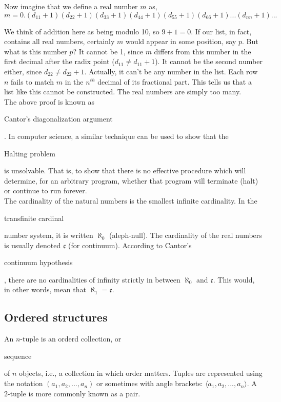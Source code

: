 \documentclass[11pt]{article}
\theoremstyle{plain}
\theoremstyle{definition}
\begin{document}
\noindent Now imagine that we define a real number $ m $ as,
$$
m = 0.(d_{11}+1)(d_{22}+1)(d_{33}+1)(d_{44}+1)(d_{55}+1)(d_{66}+1) ... (d_{nn}+1) ...
$$

\noindent We think of addition here as being modulo 10, so $ 9 + 1 = 0 $. If our list, in fact, contains all real numbers, certainly $ m $ would appear in some position, say $ p $. But what is this number $ p $? It cannot be 1, since $ m $ differs from this number in the first decimal after the radix point ($ d_{11} \ne d_{11} + 1 $). It cannot be the second number either, since $ d_{22} \ne d_{22} + 1 $. Actually, it can't be any number in the list. Each row $ n $ fails to match $ m $ in the $ n^{th} $ decimal of its fractional part. This tells us that a list like this cannot be constructed. The real numbers are simply too many. \\

\noindent The above proof is known as \begin{em}Cantor's diagonalization argument\end{em}. In computer science, a similar technique can be used to show that the \begin{em}Halting problem\end{em} is unsolvable. That is, to show that there is no effective procedure which will determine, for an arbitrary program, whether that program will terminate (halt) or continue to run forever. \\

\noindent The cardinality of the natural numbers is the smallest infinite cardinality. In the \begin{em}transfinite cardinal\end{em} number system, it is written $ \aleph_0 $ (aleph-null). The cardinality of the real numbers is usually denoted $ \mathfrak{c} $ (for continuum). 
According to Cantor's \begin{em}continuum hypothesis\end{em}, there are no cardinalities of infinity strictly in between $ \aleph_0 $ and $ \mathfrak{c} $. This would, in other words, mean that $ \aleph_1 = \mathfrak{c} $. 

\subsection*{Ordered structures}

An $ n $-tuple is an orderd collection, or \begin{em}sequence\end{em} of $ n $ objects, i.e., a collection in which order matters. Tuples are represented using the notation $ ( a_1, a_2, ..., a_n ) $ or sometimes with angle brackets: $ \langle a_1, a_2, ..., a_n \rangle $. A $ 2 $-tuple is more commonly known as a pair.
\end{document}
